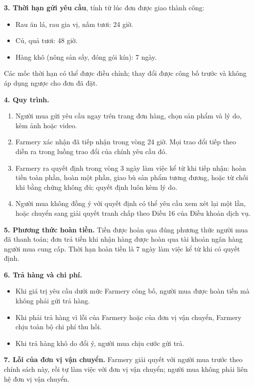 \noindent\textbf{3. Thời hạn gửi yêu cầu}, tính từ lúc đơn được giao thành công:
\begin{itemize}
    \item Rau ăn lá, rau gia vị, nấm tươi: 24 giờ.
    \item Củ, quả tươi: 48 giờ.
    \item Hàng khô (nông sản sấy, đóng gói kín): 7 ngày.
\end{itemize}
Các mốc thời hạn có thể được điều chỉnh; thay đổi được công bố trước và không
áp dụng ngược cho đơn đã đặt.

\noindent\textbf{4. Quy trình.}
\begin{enumerate}
    \item Người mua gửi yêu cầu ngay trên trang đơn hàng, chọn sản phẩm và lý
    do, kèm ảnh hoặc video.
    \item Farmery xác nhận đã tiếp nhận trong vòng 24 giờ. Mọi trao đổi tiếp
    theo diễn ra trong luồng trao đổi của chính yêu cầu đó.
    \item Farmery ra quyết định trong vòng 3 ngày làm việc kể từ khi tiếp nhận:
    hoàn tiền toàn phần, hoàn một phần, giao bù sản phẩm tương đương, hoặc từ
    chối khi bằng chứng không đủ; quyết định luôn kèm lý do.
    \item Người mua không đồng ý với quyết định có thể yêu cầu xem xét lại một
    lần, hoặc chuyển sang giải quyết tranh chấp theo Điều 16 của Điều khoản
    dịch vụ.
\end{enumerate}

\noindent\textbf{5. Phương thức hoàn tiền.} Tiền được hoàn qua đúng phương
thức người mua đã thanh toán; đơn trả tiền khi nhận hàng được hoàn qua tài
khoản ngân hàng người mua cung cấp. Thời hạn hoàn tiền là 7 ngày làm việc kể
từ khi có quyết định.

\noindent\textbf{6. Trả hàng và chi phí.}
\begin{itemize}
    \item Khi giá trị yêu cầu dưới mức Farmery công bố, người mua được hoàn
    tiền mà không phải gửi trả hàng.
    \item Khi phải trả hàng vì lỗi của Farmery hoặc của đơn vị vận chuyển,
    Farmery chịu toàn bộ chi phí thu hồi.
    \item Khi trả hàng khô do đổi ý, người mua chịu cước gửi trả.
\end{itemize}

\noindent\textbf{7. Lỗi của đơn vị vận chuyển.} Farmery giải quyết với người
mua trước theo chính sách này, rồi tự làm việc với đơn vị vận chuyển; người
mua không phải liên hệ đơn vị vận chuyển.

